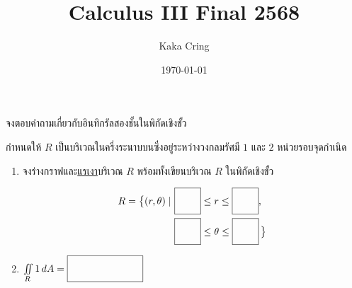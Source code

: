 \documentclass[12pt,final]{novelette} %
\title{Calculus III Final 2568}
\author{Kaka Cring}
\date{\today}
\begin{document}
\vspace*{44pt}
\enlargethispage{44pt}

\bigskip

\begin{question}
    \item {} %
     จงตอบคำถามเกี่ยวกับอินทิกรัลสองชั้นในพิกัดเชิงขั้ว
    \begin{question}
        \item กำหนดให้ $R$ เป็นบริเวณในครึ่งระนาบบนซึ่งอยู่ระหว่างวงกลมรัศมี $1$ และ $2$ หน่วยรอบจุดกำเนิด
        \begin{enumerate}[label=(\alph*),itemsep=12pt,topsep=5pt]
            \everymath={\displaystyle}
            \item จงร่างกราฟและ\uline{แรเงา}บริเวณ $R$ พร้อมทั้งเขียนบริเวณ $R$ ในพิกัดเชิงขั้ว

                  \medskip
                  \begin{minipage}{0.36\textwidth}
                  \end{minipage}
                  \begin{minipage}{0.36\textwidth}
                      \vspace*{-1.6em}
                      \begin{align*}
                          R = \bigl\{ (r, \theta) \mid \  & \ansboxi{0.7cm} \leq r \leq \ansboxi{0.7cm},              \\
                                                          & \ansboxi{0.7cm} \leq \theta \leq \ansboxi{0.7cm}\,\bigr\}
                      \end{align*}
                  \end{minipage}

            \item $\iint\limits_R 1 \, d A = \ansbox$


\end{enumerate}
\end{question}
\end{question}
\end{document}
